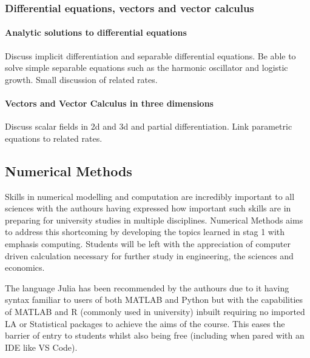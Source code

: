 \documentclass[12pt]{report}
\begin{document}
    \subsubsection{Differential equations, vectors and vector calculus}
        \paragraph*{Analytic solutions to differential equations} Discuss implicit differentiation and separable differential equations. Be able to solve simple separable equations such as the harmonic oscillator and logistic growth. Small discussion of related rates.
        
        \paragraph*{Vectors and Vector Calculus in three dimensions} Discuss scalar fields in 2d and 3d and partial differentiation. Link parametric equations to related rates.



\subsection{Numerical Methods}
    
    Skills in numerical modelling and computation are incredibly important to all sciences with the authours having expressed  how important such skills are in preparing for university studies in multiple disciplines. Numerical Methods aims to address this shortcoming by developing the topics learned in stag 1 with emphasis computing. Students will be left with the appreciation of computer driven calculation necessary for further study in engineering, the sciences and economics.


    The language Julia has been recommended by the authours due to it having syntax familiar to users of both MATLAB and Python but with the capabilities of MATLAB and R (commonly used in university) inbuilt requiring no imported LA or Statistical packages to achieve the aims of the course. This eases the barrier of entry to students whilst also being free (including when pared with an IDE like VS Code).
\end{document}
